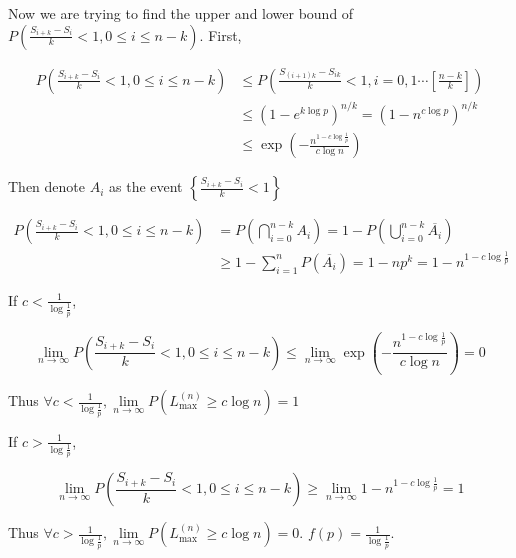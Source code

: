\documentclass{article}
\begin{document}
Now we are trying to find the upper and lower bound of $P\left(\frac{S_{i+k}-S_{i}}{k} < 1 , 0\leqslant i \leqslant n-k \right)$. First,

\begin{equation}
    \begin{aligned}
        P\left(\frac{S_{i+k}-S_{i}}{k} < 1 , 0\leqslant i \leqslant n-k \right) & \leqslant P\left(\frac{S_{(i+1)k}-S_{ik}}{k} < 1 ,  i=0,1 \cdots [\frac{n-k}{k}] \right) \\
        & \leqslant (1-e^{k\log p})^{n/k} = (1-n^{c\log p})^{n/k} \\
        & \leqslant \exp\left({-\frac{n^{1-c\log \frac{1}{p}}}{c\log n }}\right)
    \end{aligned}
\end{equation}

Then denote $A_i$ as the event $\left\{\frac{S_{i+k}-S_{i}}{k} < 1\right\}$
 
\begin{equation}
    \begin{aligned}
        P\left(\frac{S_{i+k}-S_{i}}{k} < 1 , 0\leqslant i \leqslant n-k \right) & = P(\bigcap_{i=0}^{n-k} A_i) = 1- P(\bigcup_{i=0}^{n-k} \overline{A_i}) \\
        & \geqslant 1 - \sum_{i=1}^n P( \overline{A_i}) = 1-np^k = 1- n^{1-c\log \frac{1}{p}}
    \end{aligned}
\end{equation}

If $c<\frac{1}{\log \frac{1}{p}}$, 

\begin{equation}
    \lim_{n\to \infty}  P\left(\frac{S_{i+k}-S_{i}}{k} < 1 , 0\leqslant i \leqslant n-k \right) \leqslant  \lim_{n\to\infty} \exp\left({-\frac{n^{1-c\log \frac{1}{p}}}{c\log n }}\right) = 0
\end{equation}

Thus $\forall c <\frac{1}{\log \frac{1}{p}},\lim\limits_{n\to \infty} P(L_{\max}^{(n)} \geqslant  c\log n ) = 1 $

If $c> \frac{1}{\log \frac{1}{p}}$,

\begin{equation}
    \lim_{n\to \infty}  P\left(\frac{S_{i+k}-S_{i}}{k} < 1 , 0\leqslant i \leqslant n-k \right) \geqslant \lim_{n\to \infty}  1- n^{1-c\log \frac{1}{p}} = 1
\end{equation}

Thus $\forall c >\frac{1}{\log \frac{1}{p}},\lim\limits_{n\to \infty} P(L_{\max}^{(n)} \geqslant  c\log n ) = 0 $. $f(p) = \frac{1}{\log \frac{1}{p}}$.
\end{document}
